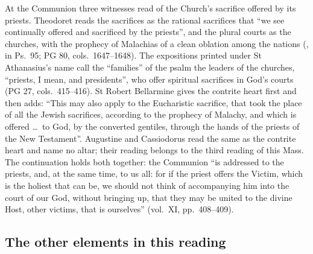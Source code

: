 At the Communion three witnesses read  of the Church's
sacrifice offered by its priests. Theodoret reads the sacrifices as the
rational sacrifices that ``we see continually offered and sacrificed by the
priests'', and the plural courts as the churches, with the prophecy of
Malachias of a clean oblation among the nations (, in Ps.~95; PG 80, cols.~1647--1648). The expositions printed under
St Athanasius's name call the ``families'' of the psalm the leaders of the
churches, ``priests, I mean, and presidents'', who offer spiritual sacrifices in
God's courts (PG 27, cols.~415--416). St Robert Bellarmine gives the contrite
heart first and then adds: ``This may also apply to the Eucharistic sacrifice,
that took the place of all the Jewish sacrifices, according to the prophecy of
Malachy, and which is offered \dots\ to God, by the converted gentiles, through
the hands of the priests of the New Testament''. Augustine and Cassiodorus read
the same  as the contrite heart and name no altar; their reading
belongs to the third reading of this Mass. The continuation holds both
together: the Communion ``is addressed to the priests, and, at the same time,
to us all: for if the priest offers the Victim, which is the holiest that can
be, we should not think of accompanying him into the court of our God, without
bringing up, that they may be united to the divine Host, other victims, that is
ourselves'' (vol.~XI, pp.~408--409).

\subsection{The other elements in this reading}

